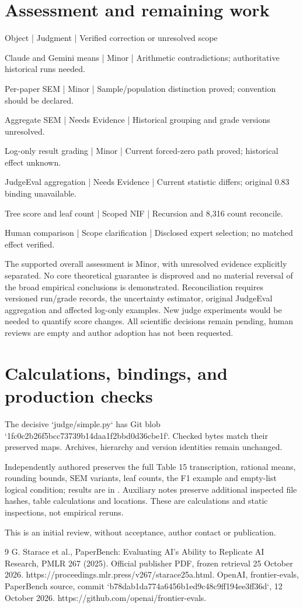 \documentclass[10pt]{article}
\begin{document}
\section*{Assessment and remaining work}
Object | Judgment | Verified correction or unresolved scope\par
Claude and Gemini means | Minor | Arithmetic contradictions; authoritative historical runs needed.\par
Per-paper SEM | Minor | Sample/population distinction proved; convention should be declared.\par
Aggregate SEM | Needs Evidence | Historical grouping and grade versions unresolved.\par
Log-only result grading | Minor | Current forced-zero path proved; historical effect unknown.\par
JudgeEval aggregation | Needs Evidence | Current statistic differs; original \(0.83\) binding unavailable.\par
Tree score and leaf count | Scoped NIF | Recursion and 8,316 count reconcile.\par
Human comparison | Scope clarification | Disclosed expert selection; no matched effect verified.\par
The supported overall assessment is Minor, with unresolved evidence explicitly separated. No core theoretical guarantee is disproved and no material reversal of the broad empirical conclusions is demonstrated. Reconciliation requires versioned run/grade records, the uncertainty estimator, original JudgeEval aggregation and affected log-only examples. New judge experiments would be needed to quantify score changes. All scientific decisions remain pending, human reviews are empty and author adoption has not been requested.\par
\section*{Calculations, bindings, and production checks}
The decisive `judge/simple.py` has Git blob `1fc0c2b26f5bcc73739b14daa1f2bbd0d36cbe1f`. Checked bytes match their preserved maps. Archives, hierarchy and version identities remain unchanged.\par
Independently authored preserves the full Table 15 transcription, rational means, rounding bounds, SEM variants, leaf counts, the F1 example and empty-list logical condition; results are in . Auxiliary notes preserve additional inspected file hashes, table calculations and locations. These are calculations and static inspections, not empirical reruns.\par
This is an initial review, without acceptance, author contact or publication.\par
9 G. Starace et al., PaperBench: Evaluating AI’s Ability to Replicate AI Research, PMLR 267 (2025). Official publisher PDF, frozen retrieval 25 October 2026. https://proceedings.mlr.press/v267/starace25a.html. OpenAI, frontier-evals, PaperBench source, commit `b78dab1da774a6456b1ed9c48c9ff194ee3ff36d`, 12 October 2026. https://github.com/openai/frontier-evals.\par
\end{document}
